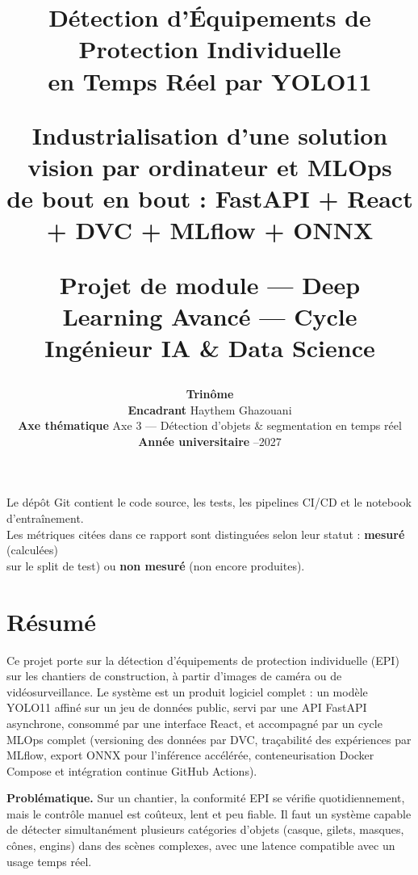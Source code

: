 \documentclass[11pt,a4paper]{article}
\title{
  \vspace{-1.5cm}
  {\LARGE\bfseries Détection d'Équipements de Protection Individuelle\\
  en Temps Réel par YOLO11\par}
  \vspace{0.6cm}
  {\large Industrialisation d'une solution vision par ordinateur et MLOps\\
  de bout en bout : FastAPI + React + DVC + MLflow + ONNX\par}
  \vspace{1.2cm}
  {\normalsize Projet de module --- Deep Learning Avancé --- Cycle Ingénieur IA \& Data Science\par}
}
\author{
  \textbf{Trinôme} \quad \todo{Nom 1 \quad Nom 2 \quad Nom 3}\\[0.4cm]
  \textbf{Encadrant} \quad Haythem Ghazouani\\[0.4cm]
  \textbf{Axe thématique} \quad Axe 3 --- Détection d'objets \& segmentation en temps réel\\
  \textbf{Année universitaire} \quad 2026--2027
}
\date{}
\newcommand{\measured}{\textcolor{okgreen}{\textbf{mesuré}}}
\newcommand{\notmeasured}{\textcolor{warn}{\textbf{non mesuré}}}
\begin{document}
\begin{titlepage}
\maketitle
\vfill
\begin{center}
\small\color{midgray}
Le dépôt Git contient le code source, les tests, les pipelines CI/CD et le notebook d'entraînement.\\
Les métriques citées dans ce rapport sont distinguées selon leur statut : \measured{} (calculées)\\
sur le split de test) ou \notmeasured{} (non encore produites).
\end{center}
\end{titlepage}

\tableofcontents
\newpage

\section{Résumé}

Ce projet porte sur la détection d'équipements de protection individuelle
(EPI) sur les chantiers de construction, à partir d'images de caméra ou de
vidéosurveillance. Le système est un produit logiciel complet : un modèle
YOLO11 affiné sur un jeu de données public, servi par une API FastAPI
asynchrone, consommé par une interface React, et accompagné par un cycle MLOps
complet (versioning des données par DVC, traçabilité des expériences par
MLflow, export ONNX pour l'inférence accélérée, conteneurisation
Docker Compose et intégration continue GitHub Actions).

\textbf{Problématique.} Sur un chantier, la conformité EPI se vérifie
quotidiennement, mais le contrôle manuel est coûteux, lent et peu fiable.
Il faut un système capable de détecter simultanément plusieurs catégories
d'objets (casque, gilets, masques, cônes, engins) dans des scènes
complexes, avec une latence compatible avec un usage temps réel.
\end{document}
